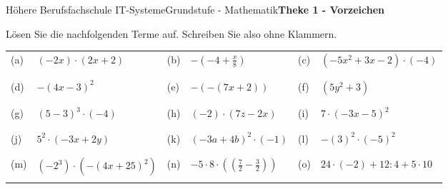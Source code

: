 \documentclass[oneside,openany,headings=optiontotoc,11pt,numbers=noenddot]{scrreprt}
\begin{document}
	\begin{worksheet}{Höhere Berufsfachschule IT-Systeme}{Grundstufe - Mathematik}{\textbf{Theke 1 - Vorzeichen}}
		\begin{framed}
			\noindent
			Lösen Sie die nachfolgenden Terme auf. Schreiben Sie also ohne Klammern.\\
			\begin{tabularx}{\textwidth}{lXlXlX}
				\\
				(a) & \((-2x)\cdot(2x+2)\) & (b) & \(-(-4+\frac{x}{8})\) & (c) & \((-5x^2+3x-2)\cdot(-4)\)\\
				\\
				\hline
				\\
				(d) & \(-(4x-3)^2\) & (e) & \(-(-(7x+2))\) & (f) & \((5y^2+3)\)\\
				\\
				\hline
				\\
				(g) & \((5-3)^3\cdot(-4)\) & (h) & \((-2)\cdot(7z-2x)\) & (i) & \(7\cdot(-3x-5)^2\)\\
				\\
				\hline
				\\
				(j) & \(5^2\cdot(-3x+2y)\) & (k) & \((-3a+4b)^2\cdot(-1)\) & (l) & \(-(3)^2\cdot(-5)^2\)\\
				\\
				\hline
				\\
				(m) & \((-2^3)\cdot(-(4x+25)^2)\) & (n) & \(-5\cdot{}8\cdot((\frac{7}{2}-\frac{3}{2}))\) & (o) & \(24\cdot(-2) + 12:4 + 5\cdot{}10\)\\
				\\
				\hline
			\end{tabularx}
		\end{framed}
	\end{worksheet}
\end{document}
